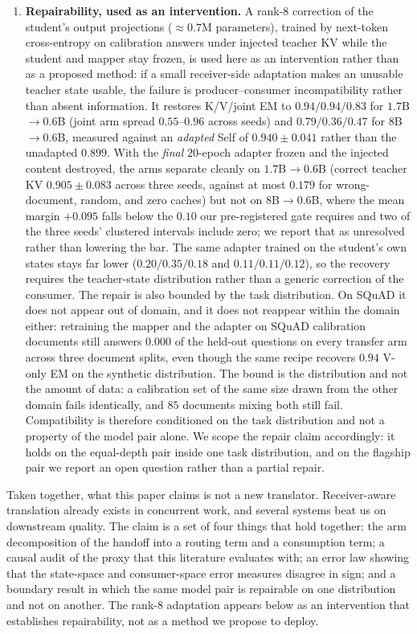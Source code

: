 \documentclass[11pt]{article}
\begin{document}
\begin{enumerate}
\item \textbf{Repairability, used as an intervention.} A rank-8 correction of the
  student's output projections ($\approx0.7$M parameters), trained by next-token
  cross-entropy on calibration answers under injected teacher KV while the
  student and mapper stay frozen, is used here as an intervention rather than as a
  proposed method: if a small receiver-side adaptation makes an unusable teacher
  state usable, the failure is producer--consumer incompatibility rather than
  absent information. It restores K/V/joint EM to $0.94/0.94/0.83$ for
  $1.7$B$\to0.6$B (joint arm spread $0.55$--$0.96$ across seeds) and
  $0.79/0.36/0.47$ for $8$B$\to0.6$B, measured against an \emph{adapted} Self of
  $0.940\pm0.041$ rather than the unadapted $0.899$. With the \emph{final}
  $20$-epoch adapter frozen and the injected content destroyed, the arms
  separate cleanly on $1.7$B$\to0.6$B (correct teacher KV $0.905\pm0.083$ across
  three seeds, against at most $0.179$ for wrong-document, random, and zero
  caches) but not on $8$B$\to0.6$B, where the mean margin $+0.095$ falls below
  the $0.10$ our pre-registered gate requires and two of the three seeds'
  clustered intervals include zero; we report that as unresolved rather than
  lowering the bar. The
  same adapter trained on the student's own states stays far lower
  ($0.20/0.35/0.18$ and $0.11/0.11/0.12$), so the recovery requires the
  teacher-state distribution rather than a generic correction of the consumer.
  The repair is also bounded by the task distribution. On SQuAD it does not appear
  out of domain, and it does not reappear within the domain either: retraining
  the mapper and the adapter on SQuAD calibration documents still answers
  $0.000$ of the held-out questions on every transfer arm across three document
  splits, even though the same recipe recovers $0.94$ V-only EM on the synthetic
  distribution. The bound is the distribution and not the amount of data: a
  calibration set of the same size drawn from the other domain fails identically,
  and $85$ documents mixing both still fail. Compatibility is therefore
  conditioned on the task distribution and not a property of the model pair
  alone.
  We scope the repair claim accordingly: it holds on the equal-depth pair inside
  one task distribution, and on the flagship pair we report an open question
  rather than a partial repair.

\end{enumerate}

Taken together, what this paper claims is not a new translator. Receiver-aware
translation already exists in concurrent work, and several systems beat us on
downstream quality. The claim is a set of four things that hold together: the
arm decomposition of the handoff into a routing term and a consumption term; a
causal audit of the proxy that this literature evaluates with; an error law
showing that the state-space and consumer-space error measures disagree in sign;
and a boundary result in which the same model pair is repairable on one
distribution and not on another. The rank-8 adaptation appears below as an
intervention that establishes repairability, not as a method we propose to deploy.
\end{document}
